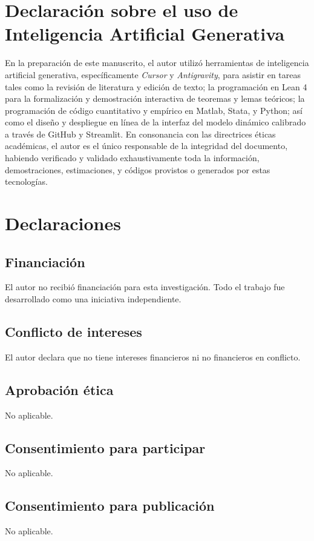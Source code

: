 \documentclass[pdflatex,sn-mathphys-ay]{sn-jnl}
\theoremstyle{thmstyleone}
\theoremstyle{thmstyletwo}
\theoremstyle{thmstylethree}
\newcommand{\1}{\mathbf{1}}
\begin{document}
\section*{Declaración sobre el uso de Inteligencia Artificial Generativa}
En la preparación de este manuscrito, el autor utilizó herramientas de inteligencia artificial generativa, específicamente \emph{Cursor} y \emph{Antigravity}, para asistir en tareas tales como la revisión de literatura y edición de texto; la programación en Lean 4 para la formalización y demostración interactiva de teoremas y lemas teóricos; la programación de código cuantitativo y empírico en Matlab, Stata, y Python; así como el diseño y despliegue en línea de la interfaz del modelo dinámico calibrado a través de GitHub y Streamlit. En consonancia con las directrices éticas académicas, el autor es el único responsable de la integridad del documento, habiendo verificado y validado exhaustivamente toda la información, demostraciones, estimaciones, y códigos provistos o generados por estas tecnologías.

\section*{Declaraciones}

\subsection*{Financiación}
El autor no recibió financiación para esta investigación. Todo el trabajo fue desarrollado como una iniciativa independiente.

\subsection*{Conflicto de intereses}
El autor declara que no tiene intereses financieros ni no financieros en conflicto.

\subsection*{Aprobación ética}
No aplicable.

\subsection*{Consentimiento para participar}
No aplicable.

\subsection*{Consentimiento para publicación}
No aplicable.
\end{document}
